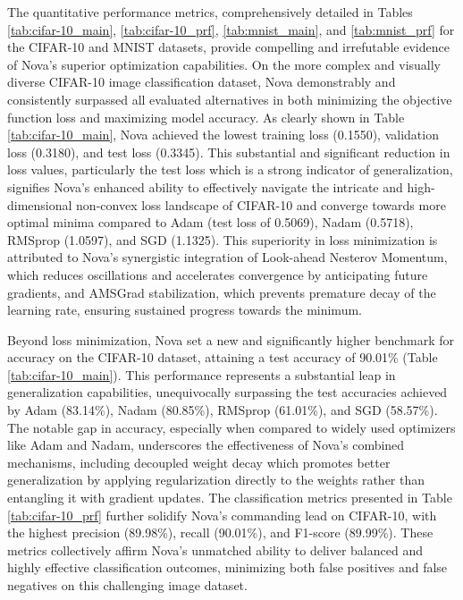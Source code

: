 \documentclass{article}
\begin{document}
The quantitative performance metrics, comprehensively detailed in Tables \ref{tab:cifar-10_main}, \ref{tab:cifar-10_prf}, \ref{tab:mnist_main}, and \ref{tab:mnist_prf} for the CIFAR-10 and MNIST datasets, provide compelling and irrefutable evidence of Nova's superior optimization capabilities. On the more complex and visually diverse CIFAR-10 image classification dataset, Nova demonstrably and consistently surpassed all evaluated alternatives in both minimizing the objective function loss and maximizing model accuracy. As clearly shown in Table \ref{tab:cifar-10_main}, Nova achieved the lowest training loss (0.1550), validation loss (0.3180), and test loss (0.3345). This substantial and significant reduction in loss values, particularly the test loss which is a strong indicator of generalization, signifies Nova's enhanced ability to effectively navigate the intricate and high-dimensional non-convex loss landscape of CIFAR-10 and converge towards more optimal minima compared to Adam (test loss of 0.5069), Nadam (0.5718), RMSprop (1.0597), and SGD (1.1325). This superiority in loss minimization is attributed to Nova's synergistic integration of Look-ahead Nesterov Momentum, which reduces oscillations and accelerates convergence by anticipating future gradients, and AMSGrad stabilization, which prevents premature decay of the learning rate, ensuring sustained progress towards the minimum.

Beyond loss minimization, Nova set a new and significantly higher benchmark for accuracy on the CIFAR-10 dataset, attaining a test accuracy of 90.01\% (Table \ref{tab:cifar-10_main}). This performance represents a substantial leap in generalization capabilities, unequivocally surpassing the test accuracies achieved by Adam (83.14\%), Nadam (80.85\%), RMSprop (61.01\%), and SGD (58.57\%). The notable gap in accuracy, especially when compared to widely used optimizers like Adam and Nadam, underscores the effectiveness of Nova's combined mechanisms, including decoupled weight decay which promotes better generalization by applying regularization directly to the weights rather than entangling it with gradient updates. The classification metrics presented in Table \ref{tab:cifar-10_prf} further solidify Nova's commanding lead on CIFAR-10, with the highest precision (89.98\%), recall (90.01\%), and F1-score (89.99\%). These metrics collectively affirm Nova's unmatched ability to deliver balanced and highly effective classification outcomes, minimizing both false positives and false negatives on this challenging image dataset.
\end{document}
